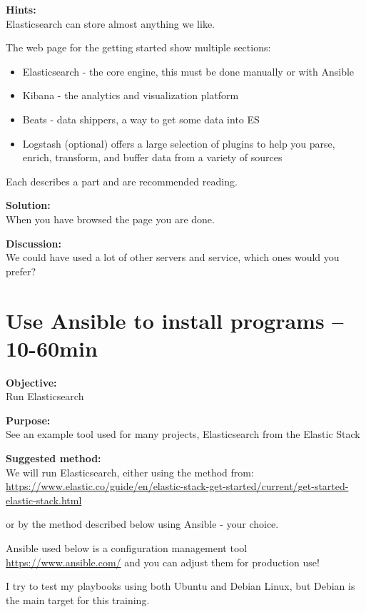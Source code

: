 \documentclass[a4paper,11pt,notitlepage]{report}
\begin{document}
{\bf Hints:}\\
Elasticsearch can store almost anything we like.

The web page for the getting started show multiple sections:
\begin{itemize}
\item Elasticsearch - the core engine, this must be done manually or with Ansible
\item Kibana - the analytics and visualization platform
\item Beats - data shippers, a way to get some data into ES
\item Logstash (optional) offers a large selection of plugins to help you parse, enrich, transform, and buffer data from a variety of sources
\end{itemize}

Each describes a part and are recommended reading.


{\bf Solution:}\\
When you have browsed the page you are done.

{\bf Discussion:}\\
We could have used a lot of other servers and service, which ones would you prefer?



\chapter{Use Ansible to install programs -- 10-60min}
\label{ex:basicansible}


{\bf Objective:}\\
Run Elasticsearch

{\bf Purpose:}\\
See an example tool used for many projects, Elasticsearch from the Elastic Stack

{\bf Suggested method:}\\
We will run Elasticsearch, either using the method from:\\{\footnotesize
\url{https://www.elastic.co/guide/en/elastic-stack-get-started/current/get-started-elastic-stack.html}}

or by the method described below using Ansible - your choice.

Ansible used below is a configuration management tool \url{https://www.ansible.com/} and you can adjust them for production use!

I try to test my playbooks using both Ubuntu and Debian Linux, but Debian is the main target for this training.
\end{document}
